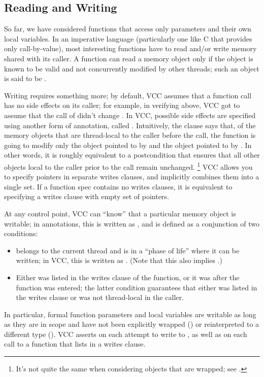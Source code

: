 \subsection{Reading and Writing}
\label{sect:writes}

So far, we have considered functions that access only parameters and
their own local variables. In an imperative language (particularly one
like C that provides only call-by-value), most interesting functions
have to read and/or write memory shared with its caller. A function
can read a memory object only if the object is known to be valid and
not concurrently modified by other threads; such an object is said to
be . 

Writing requires something more; by default, VCC assumes that a
function call has no side effects on its caller; for example, in
verifying  above, VCC got to assume that the call of
 didn't change . 
In VCC, possible side effects are specified using 
another form of annotation, called .
Intuitively, the clause  says that, 
of the memory objects that are thread-local to the caller before the call,
the function is going to modify only the object pointed to by 
and the object pointed to by .
In other words, it is roughly equivalent to a postcondition that ensures
that all other objects local to the caller prior
to the call remain unchanged.%
\footnote{It's not quite the same when considering objects that are
  wrapped; see .}  VCC allows you
to specify pointers in separate writes clauses, and implicitly
combines them into a single set. If a function spec contains no writes clauses, 
it is equivalent to specifying a writes clause with empty set of
pointers.

At any control point, VCC can ``know'' that a particular memory object
 is writable; in annotations, this is written as
, and is defined as a conjunction of two conditions:
\begin{itemize}
\item {} belongs to the current thread and is in a ``phase of
  life'' where it can be written; in VCC, this is written as 
  . (Note that this also implies .)
\item Either  was listed in the writes clause of the function,
  or it was \vcc{\unwrapped} after the function was entered; the 
  latter condition guarantees that either  was listed in the
  writes clause or was not thread-local in the caller.
\end{itemize}
In particular, formal function parameters and local variables are
writable as long as they are in scope and have not been explicitly
wrapped () or reinterpreted to a
different type ().  VCC asserts
 on each attempt to write to , as well as on
each call to a function that lists  in a writes clause.

